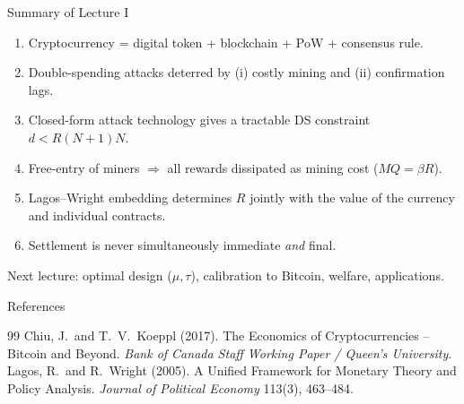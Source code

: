 \documentclass[aspectratio=169,xcolor=dvipsnames]{beamer}
\begin{document}
\begin{frame}{Summary of Lecture I}
    \begin{enumerate}
        \item Cryptocurrency = digital token + blockchain + PoW + consensus rule.
        \item Double-spending attacks deterred by (i) costly mining and (ii) confirmation lags.
        \item Closed-form attack technology gives a tractable DS constraint $d < R(N+1)N$.
        \item Free-entry of miners $\Rightarrow$ all rewards dissipated as mining cost ($MQ=\beta R$).
        \item Lagos--Wright embedding determines $R$ jointly with the value of the currency
              and individual contracts.
        \item Settlement is never simultaneously immediate \emph{and} final.
    \end{enumerate}
    \vspace{4mm}
    Next lecture: optimal design ($\mu,\tau$), calibration to Bitcoin, welfare, applications.
\end{frame}

\begin{frame}[allowframebreaks]{References}
    \small
    \begin{thebibliography}{99}
            Chiu, J.\ and T.\ V.\ Koeppl (2017). The Economics of Cryptocurrencies --
            Bitcoin and Beyond. \textit{Bank of Canada Staff Working Paper / Queen's University}.
            Lagos, R.\ and R.\ Wright (2005). A Unified Framework for Monetary Theory
            and Policy Analysis. \textit{Journal of Political Economy} 113(3), 463--484.
    \end{thebibliography}
\end{frame}
\end{document}
